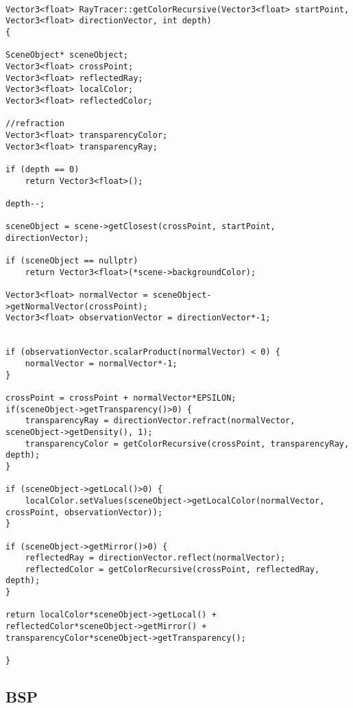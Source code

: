 \begin{lstlisting}

Vector3<float> RayTracer::getColorRecursive(Vector3<float> startPoint, Vector3<float> directionVector, int depth)
{

SceneObject* sceneObject;
Vector3<float> crossPoint;
Vector3<float> reflectedRay;
Vector3<float> localColor;
Vector3<float> reflectedColor;

//refraction
Vector3<float> transparencyColor;
Vector3<float> transparencyRay;

if (depth == 0)
    return Vector3<float>();

depth--;

sceneObject = scene->getClosest(crossPoint, startPoint, directionVector);

if (sceneObject == nullptr)
    return Vector3<float>(*scene->backgroundColor);

Vector3<float> normalVector = sceneObject->getNormalVector(crossPoint);
Vector3<float> observationVector = directionVector*-1;


if (observationVector.scalarProduct(normalVector) < 0) {
    normalVector = normalVector*-1;
}

crossPoint = crossPoint + normalVector*EPSILON;
if(sceneObject->getTransparency()>0) {
    transparencyRay = directionVector.refract(normalVector, sceneObject->getDensity(), 1);
    transparencyColor = getColorRecursive(crossPoint, transparencyRay, depth);
}

if (sceneObject->getLocal()>0) {
    localColor.setValues(sceneObject->getLocalColor(normalVector, crossPoint, observationVector));
}

if (sceneObject->getMirror()>0) {
    reflectedRay = directionVector.reflect(normalVector);
    reflectedColor = getColorRecursive(crossPoint, reflectedRay, depth);
}

return localColor*sceneObject->getLocal() + reflectedColor*sceneObject->getMirror() + transparencyColor*sceneObject->getTransparency();

}

\end{lstlisting}
	
	\subsection{BSP}
	
